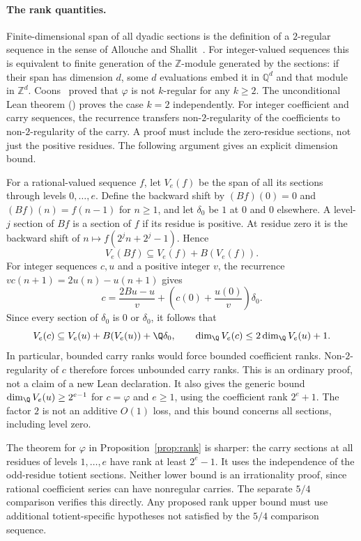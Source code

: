 \paragraph{The rank quantities.}
Finite-dimensional span of all dyadic sections is the definition of a
$2$-regular sequence in the sense of Allouche and
Shallit~\cite[Definition~2.1]{allouche-shallit}.  For
integer-valued sequences this is equivalent to finite generation of the
$\mathbb Z$-module generated by the sections: if their span has dimension $d$,
some $d$ evaluations embed it in $\mathbb Q^d$ and that module in
$\mathbb Z^d$.
Coons~\cite[Theorem~3.2]{coons} proved that
$\varphi$ is not $k$-regular for any $k\ge2$.  The
unconditional Lean theorem
()
proves the case $k=2$ independently.  For integer coefficient and carry sequences, the recurrence transfers
non-$2$-regularity of the coefficients to non-$2$-regularity of the carry.
A proof must include the zero-residue sections, not just the positive
residues. The following argument gives an explicit dimension bound.

For a rational-valued sequence $f$, let $V_e(f)$ be the span of all its sections
through levels $0,\ldots,e$. Define the backward shift by
$(Bf)(0)=0$ and $(Bf)(n)=f(n-1)$ for $n\ge1$, and let $\delta_0$ be $1$
at $0$ and $0$ elsewhere. A level-$j$ section of $Bf$ is a section of
$f$ if its residue is positive. At residue zero it is the backward shift
of $n\mapsto f(2^jn+2^j-1)$. Hence
\[
 V_e(Bf)\subseteq V_e(f)+B(V_e(f)).
\]
For integer sequences $c,u$ and a positive integer $v$, the recurrence
$v c(n+1)=2u(n)-u(n+1)$ gives
\[
 c=\frac{2Bu-u}{v}+\left(c(0)+\frac{u(0)}v\right)\delta_0.
\]
Since every section of $\delta_0$ is $0$ or $\delta_0$, it follows that
\[
 V_e(c)\subseteq V_e(u)+B(V_e(u))+\Q\delta_0,
 \qquad \dim_{\Q} V_e(c)\le2\dim_{\Q} V_e(u)+1.
\]
In particular, bounded carry ranks would force bounded coefficient ranks.
Non-$2$-regularity of $c$ therefore forces unbounded carry ranks.
This is an ordinary proof, not a claim of a new Lean declaration.
It also gives the generic bound
$\dim_{\Q} V_e(u)\ge2^{e-1}$ for $c=\varphi$ and $e\ge1$, using the
coefficient rank $2^e+1$. The factor $2$ is not an additive $O(1)$ loss,
and this bound concerns all sections, including level zero.

The theorem for $\varphi$ in Proposition~\ref{prop:rank} is sharper: the carry sections at all
residues of levels $1,\ldots,e$ have rank at least $2^e-1$. It uses the independence of the odd-residue
totient sections. Neither lower bound is an irrationality proof, since
rational coefficient series can have nonregular carries. The separate
$5/4$ comparison verifies this directly. Any proposed rank upper bound must
use additional totient-specific hypotheses not satisfied by the $5/4$
comparison sequence.

